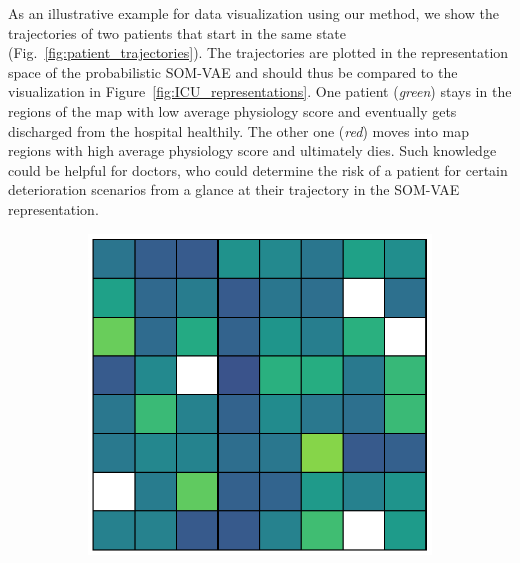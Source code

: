 As an illustrative example for data visualization using our method, we show the trajectories of two patients that start in the same state (Fig.~\ref{fig:patient_trajectories}).
The trajectories are plotted in the representation space of the probabilistic SOM-VAE and should thus be compared to the visualization in Figure~\ref{fig:ICU_representations}.
One patient (\emph{green}) stays in the regions of the map with low average physiology score and eventually gets discharged from the hospital healthily.
The other one (\emph{red}) moves into map regions with high average physiology score and ultimately dies.
Such knowledge could be helpful for doctors, who could determine the risk of a patient for certain deterioration scenarios from a glance at their trajectory in the SOM-VAE representation.

\begin{figure}
\centering
\begin{subfigure}[t]{0.22\textwidth}
\centering
\includegraphics[scale=0.25]{k_means_full_score_24_enrichment_heatmap.pdf}
\end{subfigure}
\begin{subfigure}[t]{0.22\textwidth}
\centering

\end{subfigure}
\end{figure}
